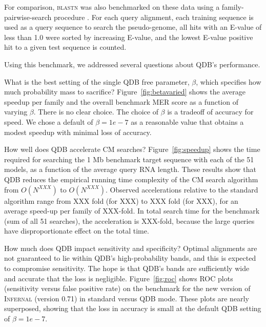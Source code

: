 \documentclass[11pt]{article}
\newif\ifdraft
\begin{document}
For comparison, \textsc{blastn} was also benchmarked on these data
using a family-pairwise-search procedure \cite{Grundy98b}. For each
query alignment, each training sequence is used as a query sequence to
search the pseudo-genome, all hits with an E-value of less than 1.0
were sorted by increasing E-value, and the lowest E-value positive hit
to a given test sequence is counted.

Using this benchmark, we addressed several questions about QDB's
performance.

What is the best setting of the single QDB free parameter, $\beta$,
which specifies how much probability mass to sacrifice?
Figure~\ref{fig:betavaried} shows the average speedup per family and
the overall benchmark MER score as a function of varying
$\beta$. There is no clear choice. The choice of $\beta$ is a tradeoff
of accuracy for speed. We chose a default of $\beta = 1e-7$ as a
reasonable value that obtains a modest speedup with minimal loss of
accuracy.

\ifdraft

\fi

How well does QDB accelerate CM searches?  Figure~\ref{fig:speedup}
shows the time required for searching the 1 Mb benchmark target
sequence with each of the 51 models, as a function of the average
query RNA length. These results show that QDB reduces the empirical
running time complexity of the CM search algorithm from $O(N^{XXX})$
to $O(N^{XXX})$. Observed accelerations relative to the standard
algorithm range from XXX fold (for XXX) to XXX fold (for XXX), for an
average speed-up per family of XXX-fold. In total search time for the
benchmark (sum of all 51 searches), the acceleration is XXX-fold,
because the large queries have disproportionate effect on the total
time.

\ifdraft

\fi

How much does QDB impact sensitivity and specificity? Optimal
alignments are not guaranteed to lie within QDB's high-probability
bands, and this is expected to compromise sensitivity. The hope is
that QDB's bands are sufficiently wide and accurate that the loss is
negligible.  Figure~\ref{fig:roc} shows ROC plots (sensitivity versus
false positive rate) on the benchmark for the new version of
\textsc{Infernal} (version 0.71) in standard versus QDB mode.  These
plots are nearly superposed, showing that the loss in accuracy is
small at the default QDB setting of $\beta=1e-7$.
\end{document}
